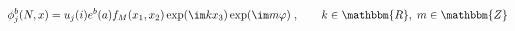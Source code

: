 \begin{equation}
\phi_{j}^{b} (N,x) = u_j (i) e^b (a) f_M ( x_1 , x_2 ) \exp (\im kx_3)
\exp(\im m \varphi)
\;, \qquad k\in \mathbbm{R},\; m \in \mathbbm{Z}
\label{G5}
\end{equation}

